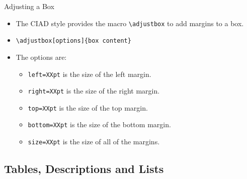\documentclass[english,sectioncirclenumberstyle]{ciadbeamer}
\begin{document}
\begin{frame}{Adjusting a Box}
	\begin{itemize}
	\item The CIAD style provides the macro \texttt{{\textbackslash}adjustbox} to add margins to a box.
	\vspace{1em}
	\item \texttt{{\textbackslash}adjustbox[options]\{box content\}}
	\vspace{1em}
	\item The options are:
		\begin{itemize}
		\item \texttt{left=XXpt} is the size of the left margin.
		\item \texttt{right=XXpt} is the size of the right margin.
		\item \texttt{top=XXpt} is the size of the top margin.
		\item \texttt{bottom=XXpt} is the size of the bottom margin.
		\item \texttt{size=XXpt} is the size of all of the margins.
		\end{itemize}
	\end{itemize}
\end{frame}

\subsection{Tables, Descriptions and Lists}
\tableofcontentslide[sectionstyle={show/shaded},subsectionstyle={show/shaded/hide},subsubsectionstyle={hide/hide/hide/hide},sections={3-}]
\end{document}
